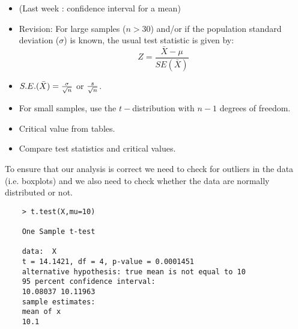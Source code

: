 \begin{itemize}
	\item (Last week : confidence interval for a mean) \item Revision:
	For large samples ($n > 30$) and/or if the population standard
	deviation ($\sigma$) is known, the usual test statistic is given
	by: \[Z =\frac{\bar{X} - \mu}{SE(\bar{X})}\]
	
	\item $S.E.(\bar{X}) = { \sigma \over \sqrt{n}} $ or ${s \over \sqrt{n}}$. 
	\item For small samples, use the $t-$distribution with $n-1$ degrees of freedom.
	\item Critical value from tables.
	\item Compare test statistics and critical values.
\end{itemize}

To ensure that our analysis is correct we need to check for
outliers in the data (i.e. boxplots) and we also need to check
whether the data are normally distributed or not.

\begin{framed}
	\begin{verbatim}
	> t.test(X,mu=10)
	
	One Sample t-test
	
	data:  X 
	t = 14.1421, df = 4, p-value = 0.0001451
	alternative hypothesis: true mean is not equal to 10 
	95 percent confidence interval:
	10.08037 10.11963 
	sample estimates:
	mean of x 
	10.1 
	\end{verbatim}
\end{framed}

